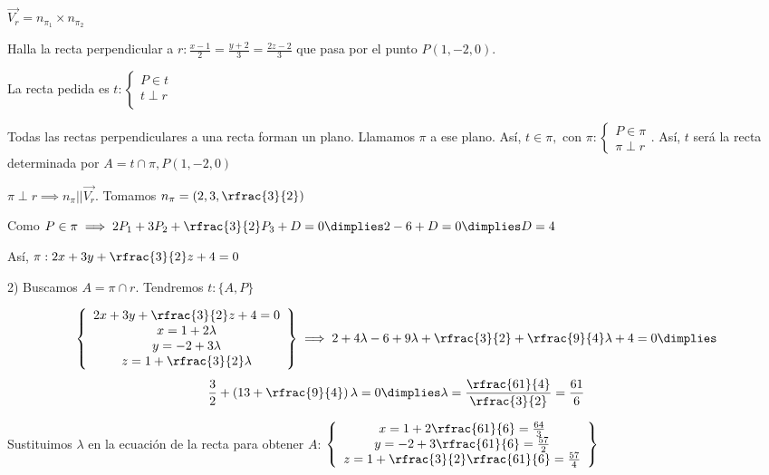 $\vec{V_r} = n_{\pi_1}\times n_{\pi_2}$

\begin{problem}

Halla la recta perpendicular a $r:\frac{x-1}{2} = \frac{y+2}{3} = \frac{2z-2}{3}$ que pasa por el punto $P(1,-2,0)$.

\solution

La recta pedida es $t:\left\{\begin{array}{c}P\in t\\t\perp r\\\end{array}\right.$ 

Todas las rectas perpendiculares a una recta forman un plano. Llamamos $\pi$ a ese plano. Así, $ t \in \pi, \text{ con } \pi:\left\{\begin{array}{c}P\in\pi\\\pi\perp r\end{array}\right.$. Así, $t$ será la recta determinada por $A = t\cap\pi, P(1,-2,0)$

$\pi\perp r\implies n_{\pi} || \vec{V_r}$. Tomamos $n_{\pi}  = \left(2,3,\rfrac{3}{2}\right)$

Como $P\in\pi\implies 2P_1 + 3P_2 +\rfrac{3}{2}P_3 + D = 0 \dimplies 2-6+D = 0 \dimplies D=4$

Así, $\pi: 2x+3y+\rfrac{3}{2}z + 4 = 0$

2) Buscamos $A=\pi\cap r$. Tendremos $t:\{A,P\}$


\[
  \left\{\begin{array}{c}
    2x+3y+\rfrac{3}{2}z + 4 = 0\\
    x = 1 + 2\lambda\\
    y = -2 + 3\lambda\\
    z = 1 + \rfrac{3}{2}\lambda\end{array}\right\} \implies 2+4\lambda - 6 + 9\lambda + \rfrac{3}{2} + \rfrac{9}{4}\lambda + 4 = 0 \dimplies 
\]
\[
  \frac{3}{2}+\left(13+\rfrac{9}{4}\right)\lambda = 0 \dimplies \lambda = \frac{\rfrac{61}{4}}{\rfrac{3}{2}} = \frac{61}{6}
\]

Sustituimos $\lambda$ en la ecuación de la recta para obtener $A$:
$\left\{\begin{array}{c}
    x = 1 + 2\rfrac{61}{6} = \frac{64}{3}\\
    y = -2 + 3\rfrac{61}{6} = \frac{57}{2}\\
    z = 1 + \rfrac{3}{2}\rfrac{61}{6} = \frac{57}{4}
\end{array}\right\}$



\end{problem}
